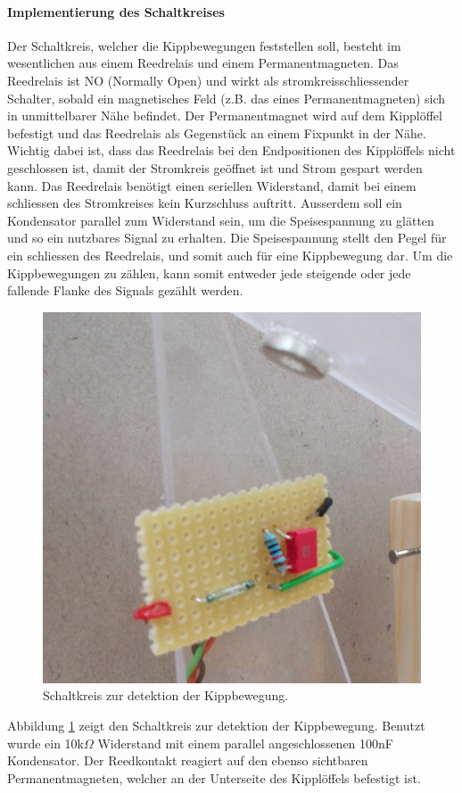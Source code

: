 \paragraph{Implementierung des Schaltkreises}
Der Schaltkreis, welcher die Kippbewegungen feststellen soll, besteht im wesentlichen aus einem Reedrelais und einem Permanentmagneten. Das Reedrelais ist NO (Normally Open) und wirkt als stromkreisschliessender Schalter, sobald ein magnetisches Feld (z.B. das eines Permanentmagneten) sich in unmittelbarer Nähe befindet. Der Permanentmagnet wird auf dem Kipplöffel befestigt und das Reedrelais als Gegenstück an einem Fixpunkt in der Nähe. Wichtig dabei ist, dass das Reedrelais bei den Endpositionen des Kipplöffels nicht geschlossen ist, damit der Stromkreis geöffnet ist und Strom gespart werden kann. Das Reedrelais benötigt einen seriellen Widerstand, damit bei einem schliessen des Stromkreises kein Kurzschluss auftritt. Ausserdem soll ein Kondensator parallel zum Widerstand sein, um die Speisespannung zu glätten und so ein nutzbares Signal zu erhalten. Die Speisespannung stellt den Pegel für ein schliessen des Reedrelais, und somit auch für eine Kippbewegung dar. Um die Kippbewegungen zu zählen, kann somit entweder jede steigende oder jede fallende Flanke des Signals gezählt werden.  

\begin{figure}[h]
\centering
\includegraphics[width=0.4\linewidth]{graphics/KippSchalt.jpg}
\caption{Schaltkreis zur detektion der Kippbewegung.}
\label{fig:KippSchalt}
\end{figure}

Abbildung \ref{fig:KippSchalt} zeigt den Schaltkreis zur detektion der Kippbewegung. Benutzt wurde ein 10k$\Omega$ Widerstand mit einem parallel angeschlossenen 100nF Kondensator. Der Reedkontakt reagiert auf den ebenso sichtbaren Permanentmagneten, welcher an der Unterseite des Kipplöffels befestigt ist.

\newpage
